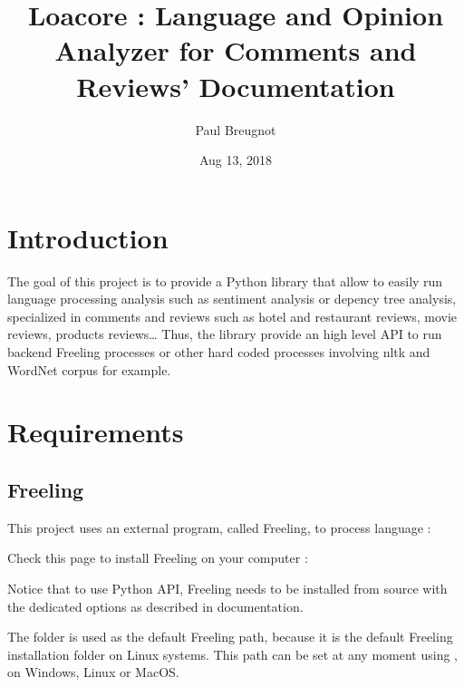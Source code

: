 \documentclass[letterpaper,10pt,english]{sphinxmanual}
\title{Loacore : Language and Opinion Analyzer for Comments and Reviews' Documentation}
\date{Aug 13, 2018}
\author{Paul Breugnot}
\begin{document}
\maketitle
\sphinxtableofcontents
{}\label{\detokenize{index::doc}}



\chapter{Introduction}
\label{\detokenize{introduction:introduction}}\label{\detokenize{introduction::doc}}

The goal of this project is to provide a Python library that allow to easily run language processing analysis such as sentiment analysis or depency tree analysis, specialized in comments and reviews such as hotel and restaurant reviews, movie reviews, products reviews… Thus, the library provide an high level API to run backend Freeling processes or other hard coded processes involving nltk and WordNet corpus for example.



\chapter{Requirements}
\label{\detokenize{requirements:requirements}}\label{\detokenize{requirements::doc}}

\section{Freeling}
\label{\detokenize{requirements:freeling}}
\begin{DUlineblock}{0em}
\item[] This project uses an external program, called Freeling, to process language : 
\item[] Check this page to install Freeling on your computer : 
\item[] Notice that to use Python API, Freeling needs to be installed from source with the dedicated options as described in documentation. 
\item[] The folder  is used as the default Freeling path, because it is the default Freeling installation folder on Linux systems. This path can be set at any moment using {\hyperref[\detokenize{configuration:loacore.conf.set_freeling_path}]{}}, on Windows, Linux or MacOS.
\end{DUlineblock}
\end{document}
